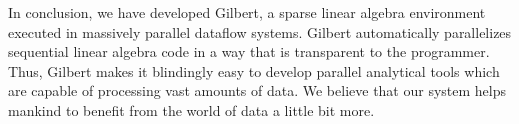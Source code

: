 In conclusion, we have developed Gilbert, a sparse linear algebra environment executed in massively parallel dataflow systems.
Gilbert automatically parallelizes sequential linear algebra code in a way that is transparent to the programmer.
Thus, Gilbert makes it blindingly easy to develop parallel analytical tools which are capable of processing vast amounts of data.
We believe that our system helps mankind to benefit from the world of data a little bit more.

